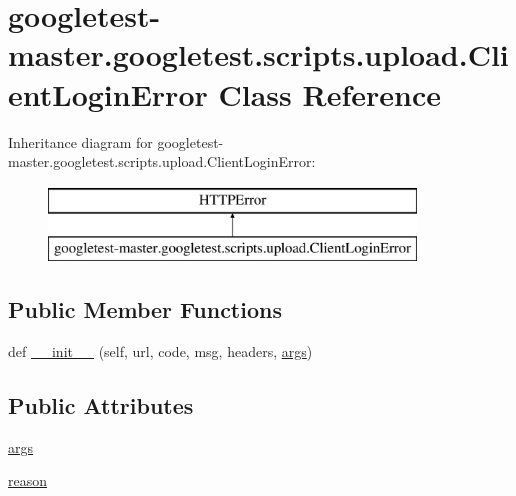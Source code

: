 \hypertarget{classgoogletest-master_1_1googletest_1_1scripts_1_1upload_1_1_client_login_error}{}\section{googletest-\/master.googletest.\+scripts.\+upload.\+Client\+Login\+Error Class Reference}
\label{classgoogletest-master_1_1googletest_1_1scripts_1_1upload_1_1_client_login_error}
Inheritance diagram for googletest-\/master.googletest.\+scripts.\+upload.\+Client\+Login\+Error\+:\begin{figure}[H]
\begin{center}
\leavevmode
\includegraphics[height=2.000000cm]{d3/dc2/classgoogletest-master_1_1googletest_1_1scripts_1_1upload_1_1_client_login_error}
\end{center}
\end{figure}
\subsection*{Public Member Functions}
\begin{DoxyCompactItemize}
\item 
def \mbox{\hyperlink{classgoogletest-master_1_1googletest_1_1scripts_1_1upload_1_1_client_login_error_a81aee5f95a8b21641ab53725c5f9eae1}{\+\_\+\+\_\+init\+\_\+\+\_\+}} (self, url, code, msg, headers, \mbox{\hyperlink{classgoogletest-master_1_1googletest_1_1scripts_1_1upload_1_1_client_login_error_ad7cb15c2afcc4c70f27c9bd60b99279f}{args}})
\end{DoxyCompactItemize}
\subsection*{Public Attributes}
\begin{DoxyCompactItemize}
\item 
\mbox{\hyperlink{classgoogletest-master_1_1googletest_1_1scripts_1_1upload_1_1_client_login_error_ad7cb15c2afcc4c70f27c9bd60b99279f}{args}}
\item 
\mbox{\hyperlink{classgoogletest-master_1_1googletest_1_1scripts_1_1upload_1_1_client_login_error_a4ac732e91de6e994f39885c030c4eae3}{reason}}
\end{DoxyCompactItemize}


